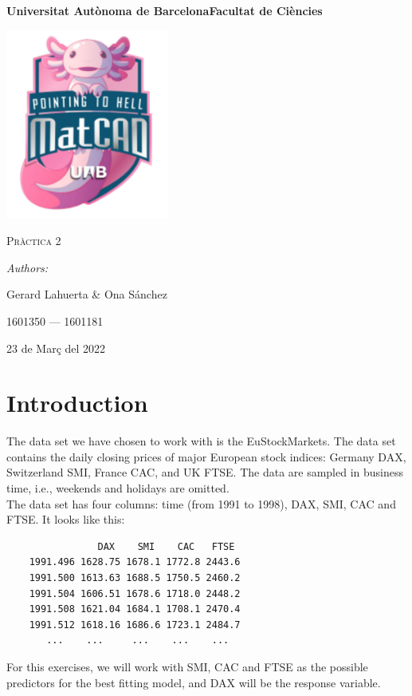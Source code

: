 \documentclass[a4paper, 11pt]{article}
\begin{document}
\begin{titlepage}
    \centering
    {\bfseries\LARGE Universitat Autònoma de Barcelona\newline Facultat de Ciències\par}
    \vspace{2cm}
    {\hspace{-1em}\includegraphics[width=0.4\textwidth]{logo.PNG}\par}
    \vspace{1cm}
    {\scshape\Huge Pràctica 2\par} %
    \vspace{1cm}
    {\Large \itshape Authors: \par}
    {\Large \hspace{-1.75em} Gerard Lahuerta \& Ona Sánchez \par}
    {\Large 1601350 --- 1601181 \par}
    \vspace{1cm}
    {\Large 23 de Març del 2022\par}
\end{titlepage}

\justifying

\newpage
\setcounter{section}{-1}
\setcounter{page}{2}
\pagestyle{plain}
\tableofcontents
\cleardoublepage
{}
\newpage

\section{Introduction}
The data set we have chosen to work with is the EuStockMarkets. The data set contains the daily closing prices of major European stock indices: Germany DAX, Switzerland SMI, France CAC, and UK FTSE. The data are sampled in business time, i.e., weekends and holidays are omitted. \\
The data set has four columns: time (from 1991 to 1998), DAX, SMI, CAC and FTSE. It looks like this:
\begin{center}
    \begin{verbatim}
                DAX    SMI    CAC   FTSE
    1991.496 1628.75 1678.1 1772.8 2443.6
    1991.500 1613.63 1688.5 1750.5 2460.2
    1991.504 1606.51 1678.6 1718.0 2448.2
    1991.508 1621.04 1684.1 1708.1 2470.4
    1991.512 1618.16 1686.6 1723.1 2484.7
       ...    ...     ...    ...    ...
    \end{verbatim}
\end{center}
For this exercises, we will work with SMI, CAC and FTSE as the possible predictors for the best fitting model, and DAX will be the response variable.
\end{document}
